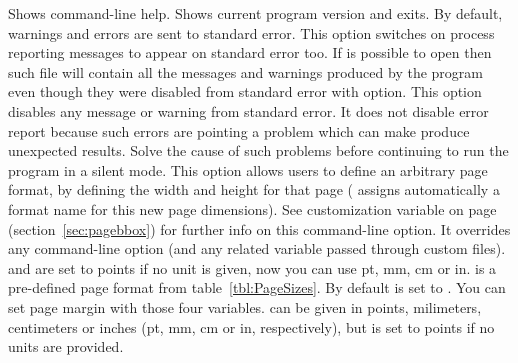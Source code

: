    { Shows command-line help. }
%
   { Shows current program version and exits. }
%
   { By default, warnings and errors are sent to standard error. This option switches on process reporting messages to appear on standard error too. }
%
   { If is possible to open  then such file will contain all the messages and warnings produced by the program even though they were disabled from standard error with  option. }
%
   { This option disables any message or warning from standard error. It does not disable error report because such errors are pointing a problem which can make {\prog} produce unexpected results. Solve the cause of such problems before continuing to run the program in a silent mode. }
%
   { This option allows users to define an arbitrary page format, by defining the width and height for that page ({\prog} assigns automatically a format name for this new page dimensions). See  customization variable on page~\pageref{sec:pagebbox} (section~\ref{sec:pagebbox}) for further info on this command-line option. It overrides any  command-line option (and any related variable passed through custom files).  and  are set to points if no unit is given, now you can use pt, mm, cm or in. }
%
   {  is a pre-defined page format from table~\ref{tbl:PageSizes}. By default is set to . }
%
%
%
%
   { You can set page margin with those four variables.  can be given in points, milimeters, centimeters or inches (pt, mm, cm or in, respectively), but is set to points if no units are provided. }
